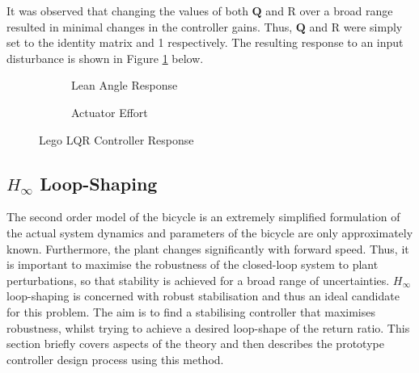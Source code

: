 It was observed that changing the values of both $\mathbf{Q}$ and R over a broad range resulted in minimal changes in the controller gains. Thus, $\mathbf{Q}$ and R were simply set to the identity matrix and 1 respectively. The resulting response to an input disturbance is shown in Figure \ref{fig:lqrLego} below.

\begin{figure}[H]
	\begin{subfigure}{0.5\textwidth}
	\caption{Lean Angle Response}
	\end{subfigure}
	\begin{subfigure}{0.5\textwidth}
	\caption{Actuator Effort}
	\end{subfigure}
	\caption{Lego LQR Controller Response}
	\label{fig:lqrLego}
\end{figure}

\subsection{$H_{\infty}$ Loop-Shaping}
The second order model of the bicycle is an extremely simplified formulation of the actual system dynamics and parameters of the bicycle are only approximately known. Furthermore, the plant changes significantly with forward speed. Thus, it is important to maximise the robustness of the closed-loop system to plant perturbations, so that stability is achieved for a broad range of uncertainties. $H_{\infty}$ loop-shaping is concerned with robust stabilisation and thus an ideal candidate for this problem. The aim is to find a stabilising controller that maximises robustness, whilst trying to achieve a desired loop-shape of the return ratio. This section briefly covers aspects of the theory and then describes the prototype controller design process using this method. \\

